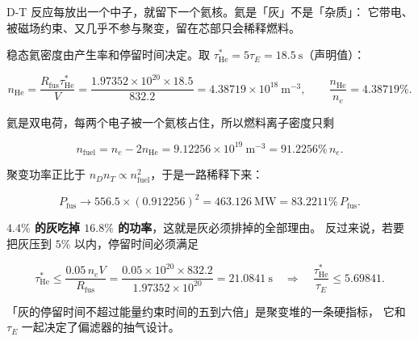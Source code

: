 D-T 反应每放出一个中子，就留下一个氦核。氦是「灰」不是「杂质」：
它带电、被磁场约束、又几乎不参与聚变，留在芯部只会稀释燃料。

稳态氦密度由产生率和停留时间决定。取 $\tau_{\mathrm{He}}^{*} = 5\tau_E = 18.5\ \mathrm{s}$（声明值）：

\begin{equation}
n_{\mathrm{He}} = \frac{R_{\mathrm{fus}}\tau_{\mathrm{He}}^{*}}{V}
= \frac{1.97352\times10^{20}\times18.5}{832.2}
= 4.38719\times10^{18}\ \mathrm{m^{-3}},
\qquad
\frac{n_{\mathrm{He}}}{n_e} = 4.38719\%.
\label{eq:app-aj-ashdens}
\end{equation}

氦是双电荷，每两个电子被一个氦核占住，所以燃料离子密度只剩

\begin{equation}
n_{\mathrm{fuel}} = n_e - 2n_{\mathrm{He}} = 9.12256\times10^{19}\ \mathrm{m^{-3}}
= 91.2256\%\,n_e .
\label{eq:app-aj-dilute}
\end{equation}

聚变功率正比于 $n_Dn_T \propto n_{\mathrm{fuel}}^{2}$，于是一路稀释下来：

\begin{equation}
P_{\mathrm{fus}} \to 556.5\times(0.912256)^{2} = 463.126\ \mathrm{MW}
= 83.2211\%\,P_{\mathrm{fus}} .
\label{eq:app-aj-ashreq}
\end{equation}

\textbf{$4.4\%$ 的灰吃掉 $16.8\%$ 的功率}，这就是灰必须排掉的全部理由。
反过来说，若要把灰压到 $5\%$ 以内，停留时间必须满足

\begin{equation}
\tau_{\mathrm{He}}^{*} \le \frac{0.05\,n_eV}{R_{\mathrm{fus}}}
= \frac{0.05\times10^{20}\times832.2}{1.97352\times10^{20}} = 21.0841\ \mathrm{s}
\quad\Longrightarrow\quad
\frac{\tau_{\mathrm{He}}^{*}}{\tau_E} \le 5.69841 .
\label{eq:app-aj-ashreq2}
\end{equation}

「灰的停留时间不超过能量约束时间的五到六倍」是聚变堆的一条硬指标，
它和 $\tau_E$ 一起决定了偏滤器的抽气设计。

